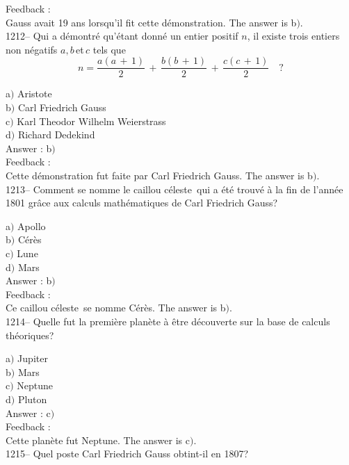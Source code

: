 ﻿\documentclass[letterpaper, 12pt]{article}
\begin{document}
Feedback : \\
Gauss avait 19 ans lorsqu'il fit cette d\'emonstration.
The answer is b$)$.\\

1212-- Qui a d\'emontr\'e qu'\'etant donn\'e un entier positif $n$,
il existe trois entiers non n\'egatifs $a,b\,$et$\,c$ tels que
$$\displaystyle{n=\frac{a(a\,+\,1)}2\,+\,\frac{b(b\,+\,1)}2\,+\,\frac{c(c\,+\,1)}2}\quad?$$

a$)$ Aristote \\
b$)$ Carl Friedrich Gauss \\
c$)$ Karl Theodor Wilhelm Weierstrass \\
d$)$ Richard Dedekind\\

Answer : b$)$\\

Feedback : \\
Cette d\'emonstration fut faite par Carl Friedrich Gauss.
The answer is b$)$.\\

1213-- Comment se nomme le \og caillou c\'eleste\fg\ qui a \'et\'e
trouv\'e \`a la fin de l'ann\'ee 1801 gr\^ace aux calculs
math\'ematiques de Carl Friedrich Gauss?

a$)$ Apollo \\
b$)$ C\'er\`es \\
c$)$ Lune \\
d$)$ Mars\\

Answer : b$)$\\

Feedback : \\
Ce \og caillou c\'eleste\fg\ se nomme C\'er\`es.
The answer is b$)$.\\

1214-- Quelle fut la premi\`ere plan\`ete \`a \^etre d\'ecouverte
sur la base de calculs th\'eoriques?

a$)$ Jupiter \\
b$)$ Mars \\
c$)$ Neptune \\
d$)$ Pluton\\

Answer : c$)$\\

Feedback : \\
Cette plan\`ete fut Neptune.
The answer is c$)$.\\

1215-- Quel poste Carl Friedrich Gauss obtint-il en 1807?
\end{document}
